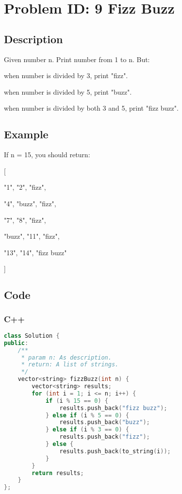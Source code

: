 \section{Problem ID: 9  Fizz Buzz}
\subsection{Description}
Given number n. Print number from 1 to n. But:

when number is divided by 3, print "fizz".

when number is divided by 5, print "buzz".

when number is divided by both 3 and 5, print "fizz buzz".

\subsection{Example}
If n = 15, you should return:

[

  "1", "2", "fizz",
  
  "4", "buzz", "fizz",
  
  "7", "8", "fizz",
  
  "buzz", "11", "fizz",
  
  "13", "14", "fizz buzz"
  
]

\subsection{Code}
\scriptsize
\subsubsection{C++}
\begin{lstlisting}[language=C++]
class Solution {
public:
    /**
     * param n: As description.
     * return: A list of strings.
     */
    vector<string> fizzBuzz(int n) {
        vector<string> results;
        for (int i = 1; i <= n; i++) {
            if (i % 15 == 0) {
                results.push_back("fizz buzz");
            } else if (i % 5 == 0) {
                results.push_back("buzz");
            } else if (i % 3 == 0) {
                results.push_back("fizz");
            } else {
                results.push_back(to_string(i));
            }
        }
        return results;
    }
};
\end{lstlisting}

